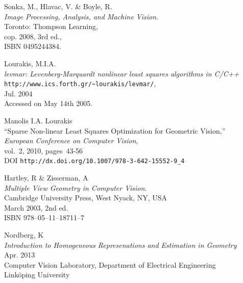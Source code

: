 \begin{thebibliography}{9}

	Sonka, M., Hlavac, V. \& Boyle, R. \\
	\emph{Image Processing, Analysis, and Machine Vision}.\\
	Toronto: Thompson Learning,\\
	cop. 2008, 3rd ed.,\\
	ISBN 0495244384.

    Lourakis, M.I.A.\\
   \emph{levmar: Levenberg-Marquardt nonlinear least squares algorithms in {C}/{C}++}\\
     \verb+http://www.ics.forth.gr/~lourakis/levmar/+,\\
    Jul. 2004\\
    Accessed on May 14th 2005.
    
    Manolis I.A. Lourakis\\
   ``Sparse Non-linear Least Squares Optimization for Geometric Vision,''\\
    \emph{European Conference on Computer Vision},\\
    vol.~2, 2010,
    pages~43-56 \\
    DOI \verb+http://dx.doi.org/10.1007/978-3-642-15552-9_4+

	Hartley, R \& Zisserman, A\\
	\emph{Multiple View Geometry in Computer Vision}.\\
	Cambridge University Press, West Nyack, NY, USA \\
	March 2003, 2nd ed.\\
	ISBN 978--05--11--18711--7
	
	Nordberg, K\\
	\emph{Introduction to Homogeneous Represenations and Estimation in Geometry}\\
	Apr. 2013\\
	Computer Vision Laboratory,	Department of Electrical Engineering\\
	Linköping University

\end{thebibliography}